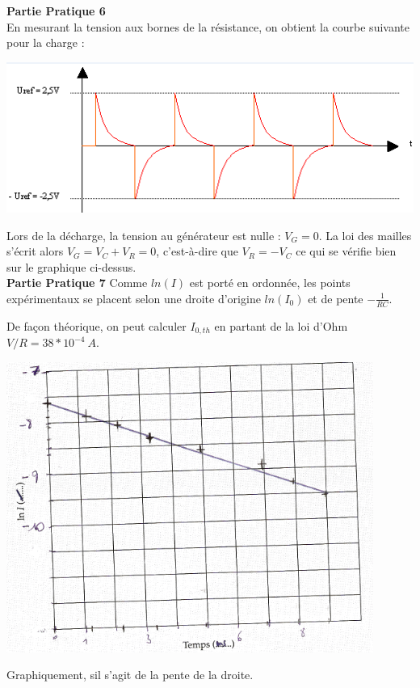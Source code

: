 \documentclass	[11pt, a4paper, openany]{book}
\begin{document}
\textbf{Partie Pratique 6}\\
En mesurant la tension aux bornes de la résistance, on obtient la courbe suivante pour la charge :
\begin{center}
\includegraphics[scale=0.5]{labo/image21.png}
\end{center}
Lors de la décharge, la tension au générateur est nulle : $V_G = 0$. La loi des mailles s'écrit alors $V_G = V_C + V_R = 0$, c'est-à-dire que $V_R = - V_C$ ce qui se vérifie bien sur le graphique ci-dessus.\\

\textbf{Partie Pratique 7}
Comme $ln(I)$ est porté en ordonnée, les points expérimentaux se placent selon une droite d'origine $ln(I_0)$ et de pente $-\frac{1}{RC}$.

De façon théorique, on peut calculer $I_{0, th}$ en partant de la loi d'Ohm $V/R = 38*10^{-4}\ A$.
\begin{center}
\includegraphics[scale=0.5]{labo/image24.png}
\end{center}

 Graphiquement, sil s'agit de la pente de la droite.\\
\end{document}
